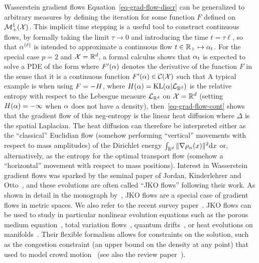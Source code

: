 \begin{rem2}{Wasserstein gradient flows}
Equation~\eqref{eq-grad-flow-discr} can be generalized to arbitrary measures by defining the iteration
for some function $F$ defined on $\mathcal{M}_+^1(\mathcal{X})$. This implicit time stepping is a useful tool to construct continuous flows, by formally taking the limit $\tau \rightarrow 0$ and introducing the time $t=\tau \ell$, so that $\alpha^{(\ell)}$ is intended to approximate a continuous flow $t \in \mathbb{R}_+ \mapsto \alpha_t$. For the special case $p=2$ and $\mathcal{X}=\mathbb{R}^d$, a formal calculus shows that $\alpha_t$ is expected to solve a PDE of the form
where $F'(\alpha)$ denotes the derivative of the function $F$ in the sense that it is a continuous function $F'(\alpha) \in \mathcal{C}(\mathcal{X})$ such that
A typical example is when using $F=-H$, where $H(\alpha)=\operatorname{KL}(\alpha|\mathcal{L}_{\mathbb{R}^d})$ is the relative entropy with respect to the Lebesgue measure $\mathcal{L}_{\mathbb{R}^d}$ on $\mathcal{X}=\mathbb{R}^d$
(setting $H(\alpha)=-\infty$ when $\alpha$ does not have a density), then~\eqref{eq-grad-flow-cont} shows that the gradient flow of this neg-entropy is the linear heat diffusion
where $\Delta$ is the spatial Laplacian.
%
The heat diffusion can therefore be interpreted either as the ``classical'' Euclidian flow (somehow performing ``vertical'' movements with respect to mass amplitudes) of the Dirichlet energy $\int_{\mathbb{R}^d} \|\nabla \rho_{\alpha}(x)\|^2 \mathrm{d} x$ or, alternatively, as the entropy for the optimal transport flow (somehow a ``horizontal'' movement with respect to mass positions).
%
Interest in Wasserstein gradient flows was sparked by the seminal paper of Jordan, Kinderlehrer and Otto~\citep{jordan1998variational}, and these evolutions are often called ``JKO flows'' following their work. As shown in detail in the monograph by~\citet{ambrosio2006gradient}, JKO flows are a special case of gradient flows in metric spaces. We also refer to the recent survey paper~\citep{santambrogio2017euclidean}.
%
JKO flows can be used to study in particular nonlinear evolution equations such as the porous medium equation~\citep{otto2001geometry}, total variation flows~\citep{carlier2017total}, quantum drifts~\citep{GianazzaARMA}, or heat evolutions on manifolds~\citep{ErbarHeatManifold}. Their flexible formalism allows for constraints on the solution, such as the congestion constraint (an upper bound on the density at any point) that~\citeauthor{maury2010macroscopic} used to model crowd motion~\citep{maury2010macroscopic} (see also the review paper~\citep{SantambrogioCrowdReview}).
\end{rem2}



